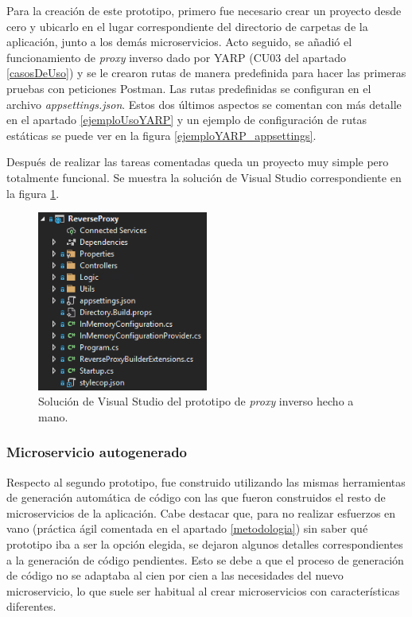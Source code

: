 \documentclass[11pt,spanish,listoffigures]{tfgetsinf}
\begin{document}
Para la creación de este prototipo, primero fue necesario crear un proyecto desde cero y ubicarlo en el lugar correspondiente del directorio de carpetas de la aplicación, junto a los demás microservicios. Acto seguido, se añadió el funcionamiento de \emph{proxy} inverso dado por YARP (CU03 del apartado \ref{casosDeUso}) y se le crearon rutas de manera predefinida para hacer las primeras pruebas con peticiones Postman. Las rutas predefinidas se configuran en el archivo \emph{appsettings.json}. Estos dos últimos aspectos se comentan con más detalle en el apartado \ref{ejemploUsoYARP} y un ejemplo de configuración de rutas estáticas se puede ver en la figura \ref{ejemploYARP_appsettings}.

Después de realizar las tareas comentadas queda un proyecto muy simple pero totalmente funcional. Se muestra la solución de Visual Studio \cite{SolutionsAndProjects} correspondiente en la figura \ref{prototipoMano}.

\begin{figure}[ht]
\centering
\includegraphics[width=0.5\textwidth]{imagenes/prototipoMano}
\caption{Solución de Visual Studio del prototipo de \emph{proxy} inverso hecho a mano.}
	\label{prototipoMano}
\end{figure}


			\subsubsection{Microservicio autogenerado}

Respecto al segundo prototipo, fue construido utilizando las mismas herramientas de generación automática de código con las que fueron construidos el resto de microservicios de la aplicación. Cabe destacar que, para no realizar esfuerzos en vano (práctica ágil comentada en el apartado \ref{metodologia}) sin saber qué prototipo iba a ser la opción elegida, se dejaron algunos detalles correspondientes a la generación de código pendientes. Esto se debe a que el proceso de generación de código no se adaptaba al cien por cien a las necesidades del nuevo microservicio, lo que suele ser habitual al crear microservicios con características diferentes.
\end{document}
